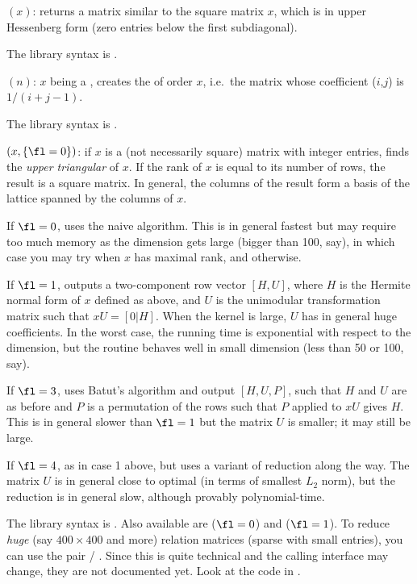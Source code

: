 $(x)$: \label{se:mathess}returns a matrix similar to the square matrix $x$, which is in upper Hessenberg
form (zero entries below the first subdiagonal).

The library syntax is .

$(n)$: \label{se:mathilbert}$x$ being a , creates the
of order $x$, i.e.~the matrix whose coefficient
($i$,$j$) is $1/ (i+j-1)$.

The library syntax is .

$(x,\{\fl=0\})$: \label{se:mathnf}if $x$ is a (not necessarily square)
matrix with integer entries, finds the \emph{upper triangular}
 of $x$. If the rank of $x$ is equal to its number
of rows, the result is a square matrix. In general, the columns of the result
form a basis of the lattice spanned by the columns of $x$.

If $\fl=0$, uses the naive algorithm. This is in general fastest but may
require too much memory as the dimension gets large (bigger than 100, say),
in which case you may try  when $x$ has
maximal rank, and  otherwise.

If $\fl=1$, outputs a two-component row vector $[H,U]$, where $H$ is the
Hermite normal form of $x$ defined as above,  and $U$ is the
unimodular transformation matrix such that $xU=[0|H]$. When the kernel is
large, $U$ has in general huge coefficients. In the worst case, the
running time is exponential with respect to the dimension, but the
routine behaves well in small dimension (less than 50 or 100, say).

If $\fl=3$, uses Batut's algorithm and output $[H,U,P]$, such that $H$ and
$U$ are as before and $P$ is a permutation of the rows such that $P$ applied
to $xU$ gives $H$. This is in general slower than $\fl=1$ but the matrix $U$
is smaller; it may still be large.

If $\fl=4$, as in case 1 above, but uses a variant of 
reduction along the way. The matrix $U$ is in general close to optimal (in
terms of smallest $L_2$ norm), but the reduction is in general slow,
although provably polynomial-time.

The library syntax is .
Also available are  ($\fl=0$) and
 ($\fl=1$). To reduce \emph{huge} (say $400 \times
400$ and more) relation matrices (sparse with small entries), you can use
the pair  / . Since this is quite technical and
the calling interface may change, they are not documented yet. Look at the
code in .

